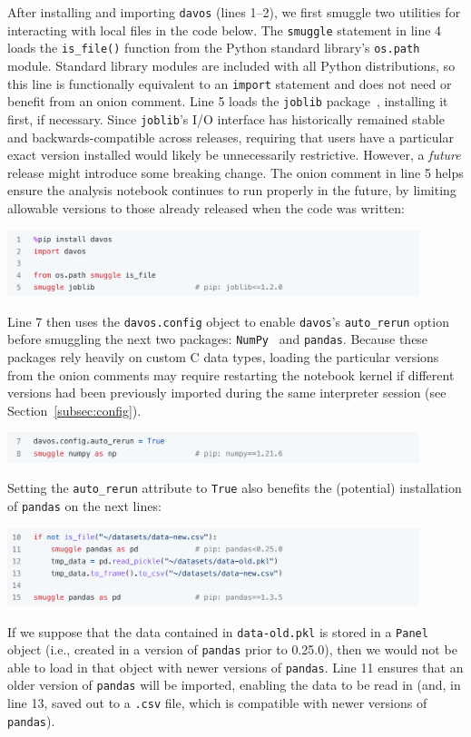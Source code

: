 \documentclass[preprint,12pt,a4paper]{elsarticle}
\begin{document}
After installing and importing \texttt{davos} (lines 1--2), we first smuggle two
utilities for interacting with local files in the code below. The
\texttt{smuggle} statement in line 4 loads the \texttt{is\_file()}
function from the Python standard library's \texttt{os.path}
module. Standard library modules are included with all Python
distributions, so this line is functionally equivalent to an
\texttt{import} statement and does not need or benefit from an onion
comment. Line 5 loads the \texttt{joblib} package~\cite{Varo10},
installing it first, if necessary. Since \texttt{joblib}'s I/O
interface has historically remained stable and backwards-compatible
across releases, requiring that users have a particular exact version
installed would likely be unnecessarily restrictive. However, a
\textit{future} release might introduce some breaking change.  The
onion comment in line 5 helps ensure the analysis notebook continues
to run properly in the future, by limiting allowable versions to those
already released when the code was written:
\begin{center}
\includegraphics[width=0.9\textwidth]{figs/example1}
\end{center}
Line 7 then uses the \texttt{davos.config} object to enable
\texttt{davos}'s \texttt{auto\_rerun} option before smuggling the next
two packages: \texttt{NumPy}~\cite{HarrEtal20} and
\texttt{pandas}. Because these packages rely heavily on custom C data
types, loading the particular versions from the onion comments may
require restarting the notebook kernel if different versions had been previously
imported during the same interpreter session (see
Section~\ref{subsec:config}).
\begin{center}
\includegraphics[width=0.9\textwidth]{figs/example2}
\end{center}
Setting the \texttt{auto\_rerun} attribute to \texttt{True} also
benefits the (potential) installation of \texttt{pandas} on the next
lines:
\begin{center}
\includegraphics[width=0.9\textwidth]{figs/example3}
\end{center}
If we suppose that the data contained in \texttt{data-old.pkl} is
stored in a \texttt{Panel} object (i.e., created in a version of
\texttt{pandas} prior to 0.25.0), then we would not be able to load in
that object with newer versions of \texttt{pandas}.  Line 11 ensures
that an older version of \texttt{pandas} will be imported, enabling
the data to be read in (and, in line 13, saved out to a \texttt{.csv}
file, which is compatible with newer versions of \texttt{pandas}).
\end{document}
